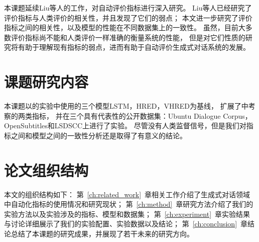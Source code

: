 本课题延续Liu等人的工作，对自动评价指标进行深入研究。
Liu等人已经研究了评价指标与人类评价的相关性，并且发现了它们的弱点；
本文进一步研究了评价指标之间的相关性，以及模型的性能在不同数据集上的一致性。
虽然，目前大多数评价指标尚不能和人类评价一样准确的衡量系统的性能，
但是对它们性质的研究将有助于理解现有指标的弱点，进而有助于自动评价生成式对话系统的发展。

\section{课题研究内容}\label{sec:reseach_content}
本课题以\cite{VHRED}的实验中使用的三个模型LSTM，HRED，VHRED为基线，
扩展了\cite{HowNot}中考察的两类指标，
并在三个具有代表性的公开数据集：Ubuntu Dialogue Corpus，OpenSubtitles和LSDSCC上进行了实验。
尽管没有人类监督信号，但是我们对指标之间和模型之间的一致性分析还是取得了有意义的结论。

\section{论文组织结构}\label{sec:paper_organization}
本文的组织结构如下：
第~\ref{ch:related_work}~章相关工作介绍了生成式对话领域中自动化指标的使用情况和研究现状；
第~\ref{ch:method}~章研究方法介绍了我们的实验方法以及实验涉及的指标、模型和数据集；
第~\ref{ch:experiment}~章实验结果与讨论详细展示了我们的实验配置、实验数据以及结论；
第~\ref{ch:conclusion}~章结论总结了本课题的研究成果，并展现了若干未来的研究方向。
